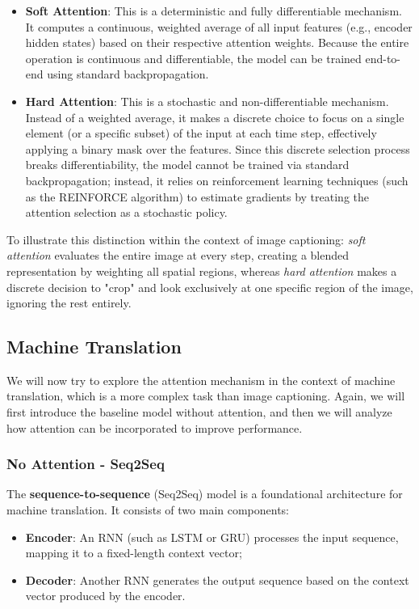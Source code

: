 \begin{itemize}
    \item \textbf{Soft Attention}: This is a deterministic and fully differentiable mechanism.
    It computes a continuous, weighted average of all input features (e.g., encoder hidden states) based on their respective attention weights.
    Because the entire operation is continuous and differentiable, the model can be trained end-to-end using standard backpropagation.

    \item \textbf{Hard Attention}: This is a stochastic and non-differentiable mechanism.
    Instead of a weighted average, it makes a discrete choice to focus on a single element (or a specific subset) of the input at each time step, effectively applying a binary mask over the features.
    Since this discrete selection process breaks differentiability, the model cannot be trained via standard backpropagation; instead, it relies on reinforcement learning techniques (such as the REINFORCE algorithm) to estimate gradients by treating the attention selection as a stochastic policy.
\end{itemize}

To illustrate this distinction within the context of image captioning: \textit{soft attention} evaluates the entire image at every step, creating a blended representation by weighting all spatial regions, whereas \textit{hard attention} makes a discrete decision to "crop" and look exclusively at one specific region of the image, ignoring the rest entirely.

\subsection{Machine Translation}

We will now try to explore the attention mechanism in the context of machine translation, which is a more complex task than image captioning.
Again, we will first introduce the baseline model without attention, and then we will analyze how attention can be incorporated to improve performance.

\subsubsection{No Attention - Seq2Seq}
The \textbf{sequence-to-sequence} (Seq2Seq) model is a foundational architecture for machine translation.
It consists of two main components:

\begin{itemize}
    \item \textbf{Encoder}: An RNN (such as LSTM or GRU) processes the input sequence, mapping it to a fixed-length context vector;

    \item \textbf{Decoder}: Another RNN generates the output sequence based on the context vector produced by the encoder.
\end{itemize}

